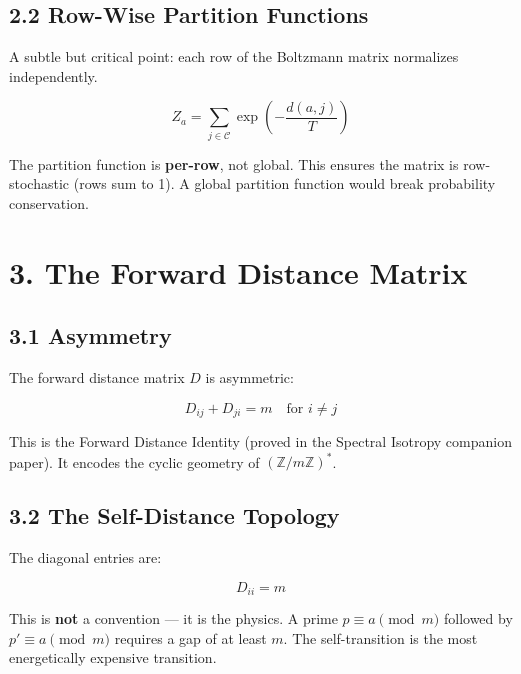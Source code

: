 \documentclass[
  11pt,
]{article}
\numberwithin{equation}{section}
\begin{document}
\subsection{2.2 Row-Wise Partition
Functions}\label{row-wise-partition-functions}

A subtle but critical point: each row of the Boltzmann matrix normalizes
independently.

\begin{equation}Z_a = \sum_{j \in \mathcal{C}} \exp\left(-\frac{d(a, j)}{T}\right)\end{equation}

The partition function is \textbf{per-row}, not global. This ensures the
matrix is row-stochastic (rows sum to 1). A global partition function
would break probability conservation.



\setcounter{section}{3}\setcounter{equation}{0}
\setcounter{section}{3}\setcounter{equation}{0}
\section{3. The Forward Distance
Matrix}\label{the-forward-distance-matrix}

\subsection{3.1 Asymmetry}\label{asymmetry}

The forward distance matrix \(D\) is asymmetric:

\begin{equation}D_{ij} + D_{ji} = m \quad \text{for } i \neq j\end{equation}

This is the Forward Distance Identity (proved in the Spectral Isotropy
companion paper). It encodes the cyclic geometry of
\((\mathbb{Z}/m\mathbb{Z})^*\).

\subsection{3.2 The Self-Distance
Topology}\label{the-self-distance-topology}

The diagonal entries are:

\begin{equation}D_{ii} = m\end{equation}

This is \textbf{not} a convention --- it is the physics. A prime
\(p \equiv a \pmod{m}\) followed by \(p' \equiv a \pmod{m}\) requires a
gap of at least \(m\). The self-transition is the most energetically
expensive transition.
\end{document}

